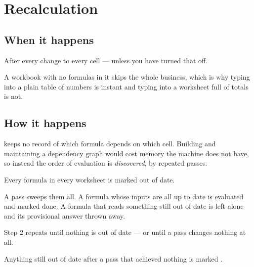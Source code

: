\chapter{Recalculation}
\label{ch:recalc}

\section{When it happens}

After every change to every cell --- unless you have turned that off.

A workbook with no formulas in it skips the whole business, which is why typing
into a plain table of numbers is instant and typing into a worksheet full of
totals is not.

\section{How it happens}

\ccprod{} keeps no record of which formula depends on which cell. Building and
maintaining a dependency graph would cost memory the machine does not have, so
instead the order of evaluation is \emph{discovered}, by repeated passes.

\begin{ccprocedure}
\item Every formula in every worksheet is marked out of date.
\item A pass sweeps them all. A formula whose inputs are all up to date is
evaluated and marked done. A formula that reads something still out of date is
left alone and its provisional answer thrown away.
\item Step 2 repeats until nothing is out of date --- or until a pass changes
nothing at all.
\item Anything still out of date after a pass that achieved nothing is marked
.
\end{ccprocedure}

